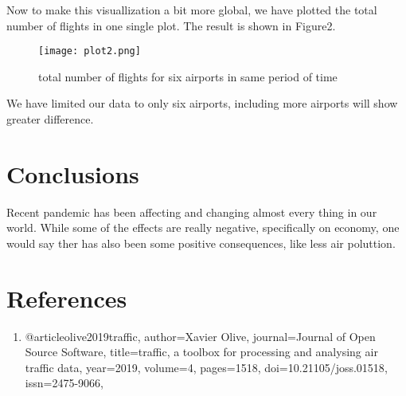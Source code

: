 \documentclass[12pt, a4paper]{article}
\begin{document}
Now to make this visuallization a bit more global, we have plotted the total number of flights in one single plot. The result is shown in Figure2.

\begin{figure}[h]
    \centering
    \texttt{[image: plot2.png]}
    \caption{total number of flights for six airports in same period of time}
    \label{fig:mesh1}
\end{figure}

We have limited our data to only six airports, including more airports will show greater difference.

\newpage
\vfill
\section{Conclusions}
Recent pandemic has been affecting and changing almost every thing in our world. While some of the effects are really negative, specifically on economy, one would say ther has also been some positive consequences, like less air poluttion.
\vfill
\clearpage
\section{References}
\begin{enumerate}
  \item @article{olive2019traffic,
    author={Xavier {Olive}},
    journal={Journal of Open Source Software},
    title={traffic, a toolbox for processing and analysing air traffic data},
    year={2019},
    volume={4},
    pages={1518},
    doi={10.21105/joss.01518},
    issn={2475-9066},
}
\end{enumerate}
\end{document}

